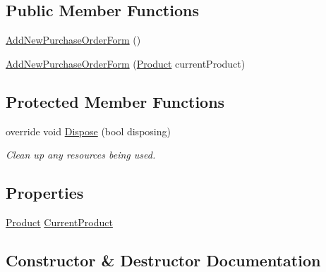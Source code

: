 \subsection*{Public Member Functions}
\begin{DoxyCompactItemize}
\item 
\hyperlink{class_health___assignment_1_1_add_new_purchase_order_form_a8fa0a0026ee694695387a6459e00a735}{Add\+New\+Purchase\+Order\+Form} ()
\item 
\hyperlink{class_health___assignment_1_1_add_new_purchase_order_form_a2643c7ac3854c5d8babc66c67f3c1eea}{Add\+New\+Purchase\+Order\+Form} (\hyperlink{class_health___assignment_1_1_product}{Product} current\+Product)
\end{DoxyCompactItemize}
\subsection*{Protected Member Functions}
\begin{DoxyCompactItemize}
\item 
override void \hyperlink{class_health___assignment_1_1_add_new_purchase_order_form_a877e3a64d43b4efd9905be6b073a0e54}{Dispose} (bool disposing)
\begin{DoxyCompactList}\small\item\em Clean up any resources being used. \end{DoxyCompactList}\end{DoxyCompactItemize}
\subsection*{Properties}
\begin{DoxyCompactItemize}
\item 
\hyperlink{class_health___assignment_1_1_product}{Product} \hyperlink{class_health___assignment_1_1_add_new_purchase_order_form_a90c7443f01cf3ee8be0c88f224a19b20}{Current\+Product}
\end{DoxyCompactItemize}


\subsection{Constructor \& Destructor Documentation}
\mbox{\label{class_health___assignment_1_1_add_new_purchase_order_form_a8fa0a0026ee694695387a6459e00a735}} 
